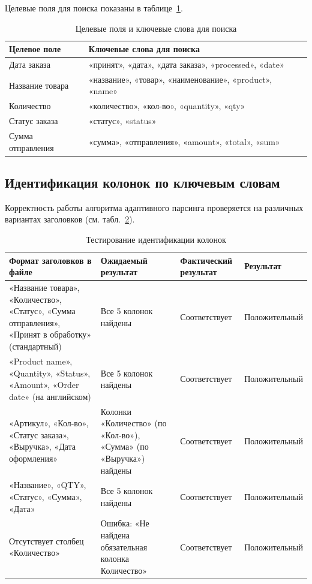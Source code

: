 Целевые поля для поиска показаны в таблице~\ref{tab:searchfilds}.

\begin{table}[H]
\caption{\label{tab:searchfilds}Целевые поля и ключевые слова для поиска}
\small
\begin{center}
\vspace{-0.5cm}\begin{tabular}{|l|l|}
\hline
Целевое поле & Ключевые слова для поиска \\ \hline
Дата заказа & «принят», «дата», «дата заказа», «processed», «date» \\ \hline
Название товара & «название», «товар», «наименование», «product», «name» \\ \hline
Количество & «количество», «кол-во», «quantity», «qty» \\ \hline
Статус заказа & «статус», «status» \\ \hline
Сумма отправления & «сумма», «отправления», «amount», «total», «sum» \\ \hline
\end{tabular}
\end{center}
\end{table}

\subsection{Идентификация колонок по ключевым словам}
Корректность работы алгоритма адаптивного парсинга проверяется на различных вариантах заголовков (см. табл.~\ref{tab:testColumns}).

\begin{table}[H]
\caption{\label{tab:testColumns}Тестирование идентификации колонок}
\small
\begin{center}
\vspace{-0.5cm}\begin{tabular}{|p{6cm}|p{3.5cm}|p{2.5cm}|p{3cm}|}
\hline
Формат заголовков в файле & Ожидаемый результат & Фактический результат & Результат \\ \hline
«Название товара», «Количество», «Статус», «Сумма отправления», «Принят в обработку» (стандартный) & Все 5 колонок найдены & Соответствует & Положительный \\ \hline
«Product name», «Quantity», «Status», «Amount», «Order date» (на английском) & Все 5 колонок найдены & Соответствует & Положительный \\ \hline
«Артикул», «Кол-во», «Статус заказа», «Выручка», «Дата оформления» & Колонки «Количество» (по «Кол-во»), «Сумма» (по «Выручка») найдены & Соответствует & Положительный \\ \hline
«Название», «QTY», «Статус», «Сумма», «Дата» & Все 5 колонок найдены & Соответствует & Положительный \\ \hline
Отсутствует столбец «Количество» & Ошибка: «Не найдена обязательная колонка Количество» & Соответствует & Положительный \\ \hline
\end{tabular}
\end{center}
\end{table}


